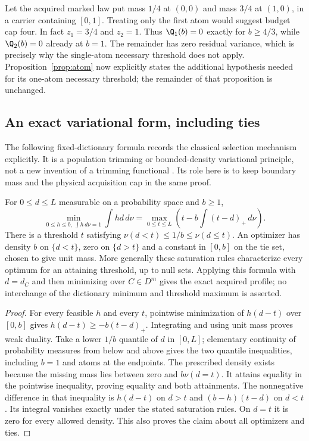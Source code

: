 \begin{example}\label{ex:two-zero-atoms}
Let the acquired marked law put mass $1/4$ at $(0,0)$ and mass $3/4$ at $(1,0)$, in a carrier containing $[0,1]$. Treating only the first atom would suggest budget cap four. In fact $z_1=3/4$ and $z_2=1$. Thus $\Q_1(b)=0$ exactly for $b\ge4/3$, while $\Q_2(b)=0$ already at $b=1$. The remainder has zero residual variance, which is precisely why the single-atom necessary threshold does not apply. Proposition~\ref{prop:atom} now explicitly states the additional hypothesis needed for its one-atom necessary threshold; the remainder of that proposition is unchanged.
\end{example}

\subsection{An exact variational form, including ties}
The following fixed-dictionary formula records the classical selection mechanism explicitly. It is a population trimming or bounded-density variational principle, not a new invention of a trimming functional \cite{CGM97,GG99}. Its role here is to keep boundary mass and the physical acquisition cap in the same proof.
\begin{proposition}\label{prop:selection-dual}
For $0\le d\le L$ measurable on a probability space and $b\ge1$,
\begin{equation}\label{eq:selection-dual}
 \min_{0\le h\le b,\ \int h\,d\nu=1}\int hd\,d\nu
 =\max_{0\le t\le L}\left(t-b\int(t-d)_+\,d\nu\right).
\end{equation}
There is a threshold $t$ satisfying $\nu(d<t)\le1/b\le\nu(d\le t)$. An optimizer has density $b$ on $\{d<t\}$, zero on $\{d>t\}$ and a constant in $[0,b]$ on the tie set, chosen to give unit mass. More generally these saturation rules characterize every optimum for an attaining threshold, up to null sets. Applying this formula with $d=d_C$ and then minimizing over $C\in D^m$ gives the exact acquired profile; no interchange of the dictionary minimum and threshold maximum is asserted.
\end{proposition}
\begin{proof}
For every feasible $h$ and every $t$, pointwise minimization of $h(d-t)$ over $[0,b]$ gives $h(d-t)\ge-b(t-d)_+$. Integrating and using unit mass proves weak duality. Take a lower $1/b$ quantile of $d$ in $[0,L]$; elementary continuity of probability measures from below and above gives the two quantile inequalities, including $b=1$ and atoms at the endpoints. The prescribed density exists because the missing mass lies between zero and $b\nu(d=t)$. It attains equality in the pointwise inequality, proving equality and both attainments. The nonnegative difference in that inequality is $h(d-t)$ on $d>t$ and $(b-h)(t-d)$ on $d<t$. Its integral vanishes exactly under the stated saturation rules. On $d=t$ it is zero for every allowed density. This also proves the claim about all optimizers and ties.
\end{proof}
